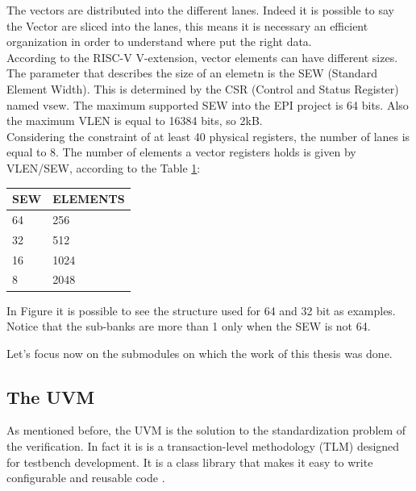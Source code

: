 The vectors are distributed into the different lanes. Indeed it is possible to say the Vector are sliced into the lanes, this means it is necessary an efficient organization in order to understand where put the right data.\\


According to the RISC-V V-extension, vector elements can have different sizes. The parameter that describes the size of an elemetn is the SEW (Standard Element Width). This is determined by the CSR (Control and Status Register) named vsew. The maximum supported SEW into the EPI project is 64 bits. Also the maximum VLEN is equal to 16384 bits, so 2kB.\\

Considering the constraint of at least 40 physical registers, the number of lanes is equal to 8.
The number of elements a vector registers holds is given by VLEN/SEW, according to the Table \ref{sew-el}:


\begin{table}[H]
    \centering
    \begin{tabular}{|l|l|}
    \hline
        \rowcolor[HTML]{C0C0C0} 
        SEW & ELEMENTS \\ \hline
        64  & 256      \\ \hline
        32  & 512      \\ \hline
        16  & 1024     \\ \hline
        8   & 2048     \\ \hline
    \end{tabular}
    \label{sew-el}
\end{table}

In Figure %
it is possible to see the structure used for 64 and 32 bit as examples.
Notice that the sub-banks are more than 1 only when the SEW is not 64.

Let's focus now on the submodules on which the work of this thesis was done.




\subsection{The UVM}
As mentioned before, the UVM is the solution to the standardization problem of the verification. In fact it is is a transaction-level methodology (TLM) designed for testbench development. It is a class library that makes it easy to write configurable and reusable code \cite{verification-book-2018}.

